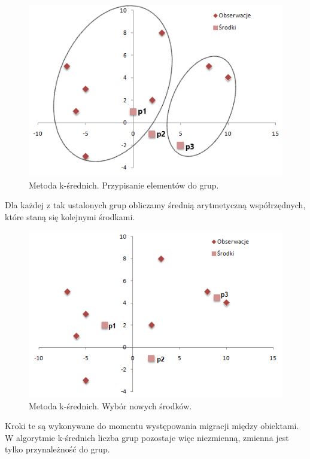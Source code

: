 \documentclass[12pt,a4paper]{report}
\begin{document}
\begin{center}
\begin{figure}[H]
\centering
\includegraphics[scale=0.8]{ks_1.png} 
\caption{Metoda k-średnich. Przypisanie elementów do grup.}
\end{figure}
\end{center}
Dla każdej z tak ustalonych grup obliczamy średnią arytmetyczną współrzędnych, które staną się kolejnymi środkami.
\begin{center}
\begin{figure}[H]
\centering
\includegraphics[scale=0.8]{ks_2.png} 
\caption{Metoda k-średnich. Wybór nowych środków.}
\end{figure}
\end{center}
Kroki te są wykonywane do momentu występowania migracji między obiektami.
\\W algorytmie k-średnich liczba grup pozostaje więc niezmienną, zmienna jest tylko przynależność do grup.
\end{document}
